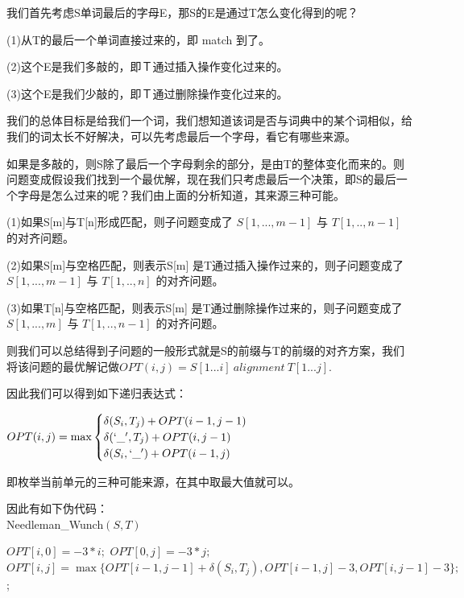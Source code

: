 我们首先考虑S单词最后的字母E，那S的E是通过T怎么变化得到的呢？

(1)从T的最后一个单词直接过来的，即 match 到了。

(2)这个E是我们多敲的，即Ｔ通过插入操作变化过来的。

(3)这个E是我们少敲的，即Ｔ通过删除操作变化过来的。

我们的总体目标是给我们一个词，我们想知道该词是否与词典中的某个词相似，给我们的词太长不好解决，可以先考虑最后一个字母，看它有哪些来源。

如果是多敲的，则S除了最后一个字母剩余的部分，是由T的整体变化而来的。则问题变成假设我们找到一个最优解，现在我们只考虑最后一个决策，即S的最后一个字母是怎么过来的呢？我们由上面的分析知道，其来源三种可能。


(1)如果S[m]与T[n]形成匹配，则子问题变成了 $S[1,...,m-1] $ 与 $T[1,..,n - 1]$ 的对齐问题。

(2)如果S[m]与空格匹配，则表示S[m] 是T通过插入操作过来的，则子问题变成了 $S[1,...,m-1] $ 与 $T[1,..,n ]$ 的对齐问题。

(3)如果T[n]与空格匹配，则表示S[m] 是T通过删除操作过来的，则子问题变成了 $S[1,...,m] $ 与 $T[1,..,n - 1]$ 的对齐问题。

则我们可以总结得到子问题的一般形式就是S的前缀与T的前缀的对齐方案，我们将该问题的最优解记做$OPT(i,j) =  S[1...i] ~ alignment ~ T[1...j]$.

因此我们可以得到如下递归表达式：

\begin{small}
$OPT( i, j) = \max \begin{cases} \delta(S_i, T_j) + OPT(i-1, j-1) &  \\
 \delta(`\_', T_j) + OPT(i, j-1) & \\
 \delta(S_i,`\_') + OPT(i-1,j)
\end{cases}$
\end{small}

即枚举当前单元的三种可能来源，在其中取最大值就可以。

因此有如下伪代码：
\\

{\sc Needleman\_Wunch}$( S, T )$
\begin{algorithmic}[1]
\STATE $OPT[i,0] = -3*i;$
\ENDFOR
{}
\STATE $OPT[0,j] = -3*j;$
\ENDFOR
{}
\STATE $OPT[i,j] = \max \{OPT[i-1, j-1] + \delta(S_i,T_j), OPT[i-1, j] - 3, OPT[i, j-1] - 3\};$
\ENDFOR
\ENDFOR
{};
\end{algorithmic}

